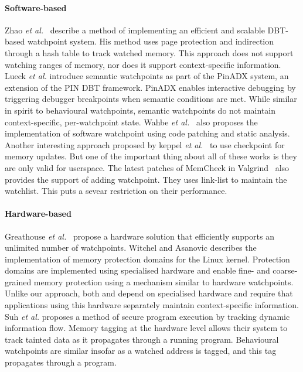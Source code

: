 \paragraph{Software-based}
Zhao \emph{et al.}~\cite{Zhao:2008} describe a method of implementing an efficient and scalable DBT-based watchpoint system. His method uses page protection and indirection through a hash table to track watched memory. This approach does not support watching ranges of memory, nor does it support context-specific information. Lueck \emph{et al.} \cite{PinADX} introduce semantic watchpoints as part of the PinADX system, an extension of the PIN DBT framework. PinADX enables interactive debugging by triggering debugger breakpoints when semantic conditions are met. While similar in spirit to behavioural watchpoints, semantic watchpoints do not maintain context-specific, per-watchpoint state. Wahbe \emph{et al.}~\cite{Wahbe:1992} also proposes the implementation of software watchpoint using code patching and static analysis.  Another interesting approach proposed by keppel \emph{et al.}~\cite{Keppel:93a} to use checkpoint for memory updates. But one of the important thing about all of these works is they are only valid for userspace. The latest patches of MemCheck in Valgrind~\cite{Seward:2005} also provides the support of adding watchpoint. They uses link-list to maintain the watchlist. This puts a sevear restriction on their performance.   

\paragraph{Hardware-based}
Greathouse \emph{et al.}~\cite{UnlimitedWatchpoints} propose a hardware solution that efficiently supports an unlimited number of watchpoints. Witchel and Asanovic \cite{Mondrix} describes the implementation of memory protection domains for the Linux kernel. Protection domains are implemented using specialised hardware and enable fine- and coarse-grained memory protection using a mechanism similar to hardware watchpoints. Unlike our approach, both \cite{Mondrix} and \cite{UnlimitedWatchpoints} depend on specialised hardware and require that applications using this hardware  separately maintain context-specific information. Suh \emph{et al.} \cite{SecureProgramExecFlowTracking} proposes a method of secure program execution by tracking dynamic information flow. Memory tagging at the hardware level allows their system to track tainted data as it propagates through a running program. Behavioural watchpoints are similar insofar as a watched address is tagged, and this tag propagates through a program.

